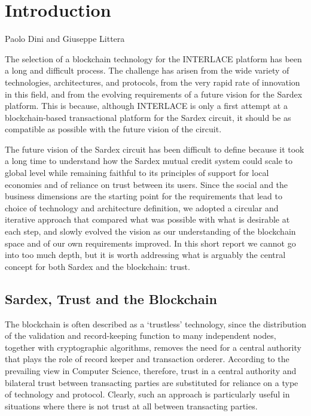 \chapter{Introduction}
\label{ch:Introduction}

\vspace{-1cm}
\begin{center}
Paolo Dini and Giuseppe Littera
\end{center}

The selection of a blockchain technology for the INTERLACE platform has been a long and difficult process. The challenge has arisen from the wide variety of technologies, architectures, and protocols, from the very rapid rate of innovation in this field, and from the evolving requirements of a future vision for the Sardex platform. This is because, although INTERLACE is only a first attempt at a blockchain-based transactional platform for the Sardex circuit, it should be as compatible as possible with the future vision of the circuit.

The future vision of the Sardex circuit has been difficult to define because it took a long time to understand how the Sardex mutual credit system could scale to global level while remaining faithful to its principles of support for local economies and of reliance on trust between its users. Since the social and the business dimensions are the starting point for the requirements that lead to choice of technology and architecture definition, we adopted a circular and iterative approach that compared what was possible with what is desirable at each step, and slowly evolved the vision as our understanding of the blockchain space and of our own requirements improved. In this short report we cannot go into too much depth, but it is worth addressing what is arguably the central concept for both Sardex and the blockchain: trust.

\section{Sardex, Trust and the Blockchain}
The blockchain is often described as a `trustless' technology, since the distribution of the validation and record-keeping function to many independent nodes, together with cryptographic algorithms, removes the need for a central authority that plays the role of record keeper and transaction orderer. According to the prevailing view in Computer Science, therefore, trust in a central authority and bilateral trust between transacting parties are substituted for reliance on a type of technology and protocol. Clearly, such an approach is particularly useful in situations where there is not trust at all between transacting parties.

